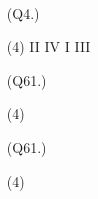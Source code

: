 \documentclass[12pt]{article} %
\theoremstyle{ex}
\begin{document}
\begin{qstn}
  \begin{solution} \texttt{   }
    \begin{enumerate}
      \item [(Q4.)]
    \begin{tasks}(4)
      \task II
      \task IV
      \task I
      \task III
    \end{tasks}

   \item [(Q61.)]
    \begin{tasks}(4)
    \end{tasks}

  \item [(Q61.)]
    \begin{tasks}(4)
    \end{tasks}
  \end{enumerate}

  \end{solution}
\end{qstn}
\end{document}

